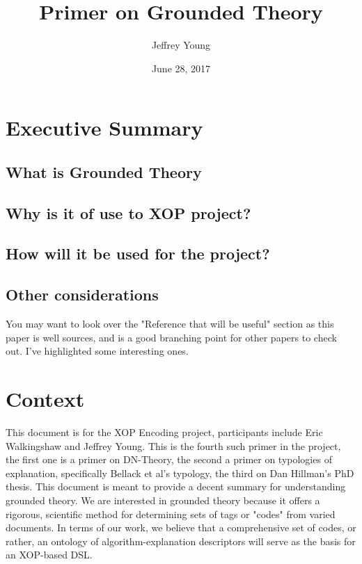 \documentclass[10pt, letterpaper]{article}
\author{Jeffrey Young}
\date{June 28, 2017}
\title{Primer on Grounded Theory}
\begin{document}
\maketitle

\section*{Executive Summary}
\label{sec:orgfad9097}
\subsection*{What is Grounded Theory}
\label{sec:org07fdb36}

\subsection*{Why is it of use to XOP project?}
\label{sec:org28b1f8f}

\subsection*{How will it be used for the project?}
\label{sec:org90ce7cc}

\subsection*{Other considerations}
\label{sec:org969f719}
You may want to look over the "Reference that will be useful" section as this
paper is well sources, and is a good branching point for other papers to
check out. I've highlighted some interesting ones.
\section*{Context}
\label{sec:org4f77f12}
This document is for the XOP Encoding project, participants include Eric
Walkingshaw and Jeffrey Young. This is the fourth such primer in the project,
the first one is a primer on DN-Theory, the second a primer on typologies of
explanation, specifically Bellack et al's typology, the third on Dan Hillman's
PhD thesis. This document is meant to provide a decent summary for
understanding grounded theory. We are interested in grounded theory because it
offers a rigorous, scientific method for determining sets of tags or "codes"
from varied documents. In terms of our work, we believe that a comprehensive
set of codes, or rather, an ontology of algorithm-explanation descriptors will
serve as the basis for an XOP-based DSL.
\end{document}
